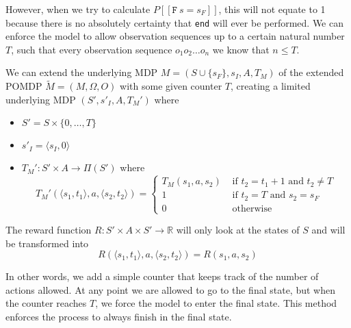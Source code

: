 However, when we try to calculate $P[[ \texttt{F}\:s=s_F]]$, this will not equate to 1 because there is no absolutely certainty that \texttt{end} will ever be performed. We can enforce the model to allow observation sequences up to a certain natural number $T$, such that every observation sequence $o_1 o_2 \dots o_n$ we know that $n\leq T$. 

\begin{definition}
We can extend the underlying MDP $M=(S\cup\{s_F\}, s_I, A, T_M)$ of the extended POMDP $\widetilde{M}=(M,\Omega,O)$ with some given counter $T$, creating a limited underlying MDP $(S',s'_I,A,T_M')$ where
\begin{itemize}
	\item $S' = S\times \{0,\dots, T\}$
	\item $s'_I = \langle s_I,0\rangle$
	\item $T_M':S'\times A \to \Pi(S')$ where 
	\[T_M'(\langle s_1,t_1\rangle,a,\langle s_2,t_2\rangle) = \begin{cases}
	T_M(s_1,a,s_2) & \text{ if } t_2 = t_1 + 1 \text{ and } t_2 \neq T\\
	1 & \text{ if } t_2 = T \text{ and } s_2 = s_F \\
	0 & \text{ otherwise }
	\end{cases}\]
\end{itemize}
\label{d:limited_pomdp}

The reward function $R:S'\times A\times S' \to \mathbb{R}$ will only look at the states of $S$ and will be transformed into
\[R(\langle s_1, t_1\rangle, a, \langle s_2, t_2\rangle) = R(s_1,a,s_2)\]
\end{definition}

In other words, we add a simple counter that keeps track of the number of actions allowed. At any point we are allowed to go to the final state, but when the counter reaches $T$, we force the model to enter the final state. This method enforces the process to always finish in the final state. \\

